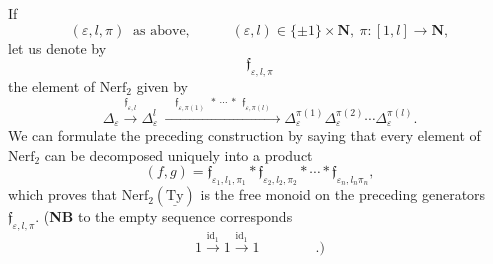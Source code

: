\documentclass[11pt]{article}
\newcommand{\uTy}{\underline{\mathrm{Ty}}}
\begin{document}
If
\[
(\varepsilon,l,\pi)\ \text{ as above,} \qquad\quad (\varepsilon,l)\in\{\pm1\}\times\mathbf{N},\ \pi : [1,l]\longrightarrow\mathbf{N},
\]
let us denote by
\[
\mathfrak{f}_{\varepsilon,l,\pi}
\]
the element of $\mathrm{Nerf}_2$ given by
\[
\Delta_\varepsilon\xrightarrow{\mathfrak{f}_{\varepsilon,l}}\Delta^l_\varepsilon\ \xrightarrow{\quad\mathfrak{f}_{\varepsilon,\pi(1)}\ \ *\ \cdots\ *\ \ \mathfrak{f}_{\varepsilon,\pi(l)}\quad}\Delta^{\pi(1)}_\varepsilon\Delta^{\pi(2)}_\varepsilon\cdots\Delta^{\pi(l)}_\varepsilon.
\]
We can formulate the preceding construction by saying that every element of $\mathrm{Nerf}_2$ can be decomposed uniquely into a product
\[
(f,g) = \mathfrak{f}_{\varepsilon_1,l_1,\pi_1}*\mathfrak{f}_{\varepsilon_2,l_2,\pi_2}*\cdots*\mathfrak{f}_{\varepsilon_n,l_n\pi_n}, %
\]
which proves that $\mathrm{Nerf}_2(\uTy)$ is the free monoid on the preceding generators $\mathfrak{f}_{\varepsilon,l,\pi}$. (\textbf{NB} to the empty sequence corresponds
\[
1\xrightarrow{\mathrm{id}_1}1\xrightarrow{\mathrm{id}_1}1 \qquad\qquad .)
\]
\end{document}
